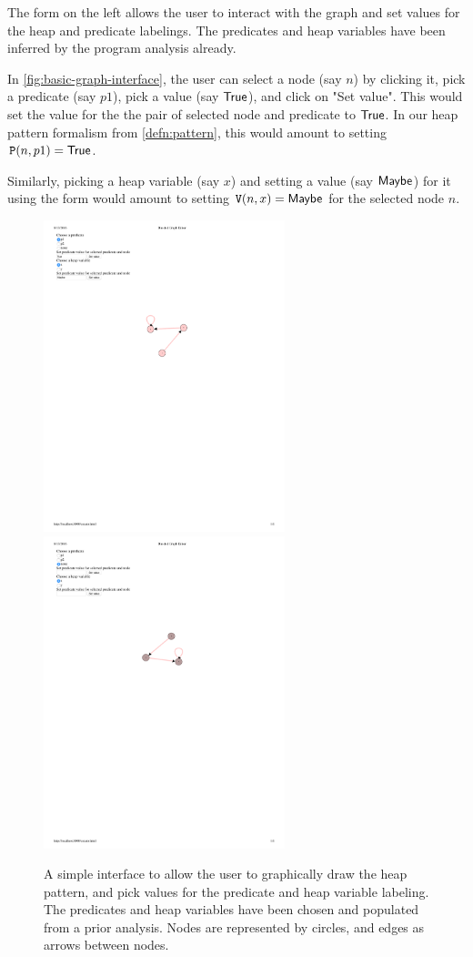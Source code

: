 The form on the left allows the user to interact with the graph and set values for the heap and predicate labelings. The predicates and heap variables have been inferred by the program analysis already.

\begin{ex}
\label{ex:basic-graph-interface}
In \autoref{fig:basic-graph-interface}, the user can select a node (say $n$) by clicking it, pick a predicate (say $p1$), pick a value (say $\mathsf{True}$), and click on "Set value". This would set the value for the the pair of selected node and predicate to $\mathsf{True}$. In our heap pattern formalism from \autoref{defn:pattern}, this would amount to setting $\mathtt{P}(n, p1) = \mathsf{True}$.

Similarly, picking a heap variable (say $x$) and setting a value (say $\mathsf{Maybe}$) for it using the form would amount to setting $\mathtt{V}(n,x) = \mathsf{Maybe}$ for the selected node $n$.
\end{ex}

\begin{figure}
  \centering
  \includegraphics[width=7cm]{fig/predicate-heapvar-val.pdf}
  \includegraphics[width=7cm]{fig/basic-graph.pdf}
  \caption{A simple interface to allow the user to graphically draw the heap pattern, and pick values for the predicate and heap variable labeling. The predicates and heap variables have been chosen and populated from a prior analysis. Nodes are represented by circles, and edges as arrows between nodes.
  }
  \label{fig:basic-graph-interface}
\end{figure}


